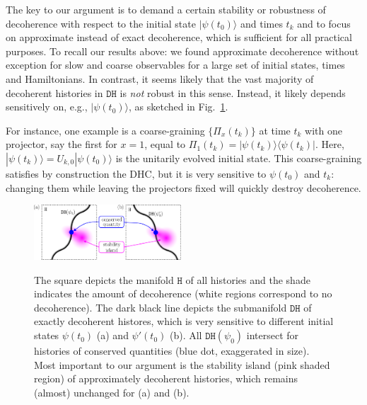 \documentclass[pre,twocolumn,10pt,aps,longbibliography,nofootinbib]{revtex4-1}
\newcommand{\rl}[0]{{\rangle\langle}}
\newcommand{\blue}[1]{#1}
\begin{document}
The \blue{key to our argument} is to demand a certain stability or robustness of decoherence with respect to the initial state $|\psi(t_0)\rangle$ and times $t_k$ \blue{and to focus on approximate instead of exact decoherence, which is sufficient for all practical purposes}. To \blue{recall our results above}: we found approximate decoherence without exception for slow and coarse observables for a large set of initial states, times and Hamiltonians. In contrast, it seems likely that the vast majority of decoherent histories in $\texttt{DH}$ is \emph{not} robust in this sense. Instead, it likely depends sensitively on, e.g., $|\psi(t_0)\rangle$, as sketched in Fig.~\ref{fig set selection problem}.

For instance, one example is a coarse-graining $\{\Pi_x(t_k)\}$ at time $t_k$ with one projector, say the first for $x=1$, equal to $\Pi_{1}(t_k) = |\psi(t_k)\rl\psi(t_k)|$. Here, $|\psi(t_k)\rangle = U_{k,0}|\psi(t_0)\rangle$ is the unitarily evolved initial state. This coarse-graining satisfies by construction the DHC, but it is very sensitive to $\psi(t_0)$ and $t_k$: changing them while leaving the projectors fixed will quickly destroy decoherence.

\begin{figure}[t]
 \centering\includegraphics[width=0.49\textwidth,clip=true]{set_selection_problem.pdf}
 \label{fig set selection problem}\vspace{-0.5cm}
 \caption{The square depicts the manifold $\texttt{H}$ of all histories and the shade indicates the amount of decoherence (white regions correspond to no decoherence). The dark black line depicts the submanifold $\texttt{DH}$ of exactly decoherent histores, which is very sensitive to different initial states $\psi(t_0)$ (a) and $\psi'(t_0)$ (b). All $\texttt{DH}(\psi_0)$ intersect for histories of conserved quantities (blue dot, exaggerated in size). Most important to our argument is the stability island (pink shaded region) of approximately decoherent histories, which remains (almost) unchanged for (a) and (b). }
\end{figure}
\end{document}
